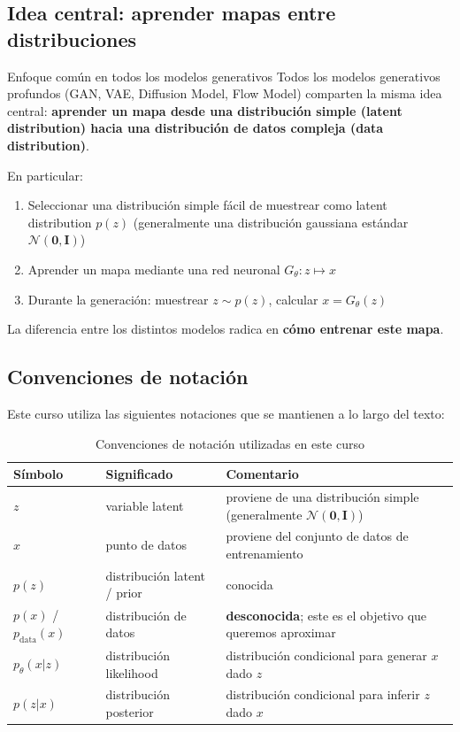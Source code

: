 \documentclass[a4paper]{article}
\begin{document}
\subsection{Idea central: aprender mapas entre distribuciones}

\begin{importantbox}{Enfoque común en todos los modelos generativos}
Todos los modelos generativos profundos (GAN, VAE, Diffusion Model, Flow Model) comparten la misma idea central: \textbf{aprender un mapa desde una distribución simple (latent distribution) hacia una distribución de datos compleja (data distribution)}.

En particular:
\begin{enumerate}
    \item Seleccionar una distribución simple fácil de muestrear como latent distribution $p(z)$ (generalmente una distribución gaussiana estándar $\mathcal{N}(\mathbf{0}, \mathbf{I})$)
    \item Aprender un mapa mediante una red neuronal $G_\theta: z \mapsto x$
    \item Durante la generación: muestrear $z \sim p(z)$, calcular $x = G_\theta(z)$
\end{enumerate}
La diferencia entre los distintos modelos radica en \textbf{cómo entrenar este mapa}.
\end{importantbox}

\subsection{Convenciones de notación}

Este curso utiliza las siguientes notaciones que se mantienen a lo largo del texto:

\begin{table}[H]
\centering
\begin{tabular}{lll}
\toprule
Símbolo & Significado & Comentario \\
\midrule
$z$ & variable latent & proviene de una distribución simple (generalmente $\mathcal{N}(\mathbf{0}, \mathbf{I})$) \\
$x$ & punto de datos & proviene del conjunto de datos de entrenamiento \\
$p(z)$ & distribución latent / prior & conocida \\
$p(x)$ / $p_{\text{data}}(x)$ & distribución de datos & \textbf{desconocida}; este es el objetivo que queremos aproximar \\
$p_\theta(x|z)$ & distribución likelihood & distribución condicional para generar $x$ dado $z$ \\
$p(z|x)$ & distribución posterior & distribución condicional para inferir $z$ dado $x$ \\
\bottomrule
\end{tabular}
\caption{Convenciones de notación utilizadas en este curso}
\end{table}
\end{document}
